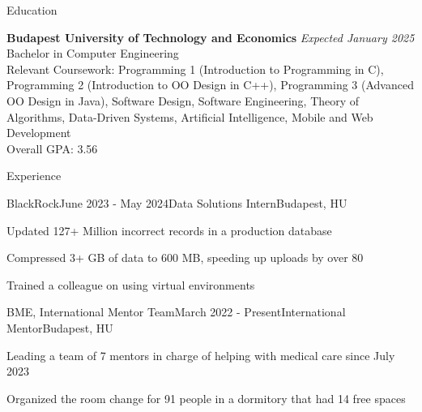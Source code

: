 \documentclass[
	a4paper, %
	11pt, %
]{resume} %
\begin{document}

\begin{rSection}{Education}
	
	\textbf{Budapest University of Technology and Economics} \hfill \textit{Expected January 2025} \\ 
	Bachelor in Computer Engineering \\
	Relevant Coursework: Programming 1 (Introduction to Programming in C), Programming 2 (Introduction to OO Design in C++), Programming 3 (Advanced OO Design in Java), Software Design, Software Engineering, Theory of Algorithms, Data-Driven Systems, Artificial Intelligence, Mobile and Web Development \\
	Overall GPA: 3.56
	
\end{rSection}


\begin{rSection}{Experience}

	\begin{rSubsection}{BlackRock}{June 2023 - May 2024}{Data Solutions Intern}{Budapest, HU}
		\item Updated 127+ Million incorrect records in a production database
		\item Compressed 3+ GB of data to 600 MB, speeding up uploads by over 80%
		\item Trained a colleague on using virtual environments
	\end{rSubsection}


	\begin{rSubsection}{BME, International Mentor Team}{March 2022 - Present}{International Mentor}{Budapest, HU}
		\item Leading a team of 7 mentors in charge of helping with medical care since July 2023
		\item Organized the room change for 91 people in a dormitory that had 14 free spaces
	\end{rSubsection}

\end{rSection}
\end{document}
